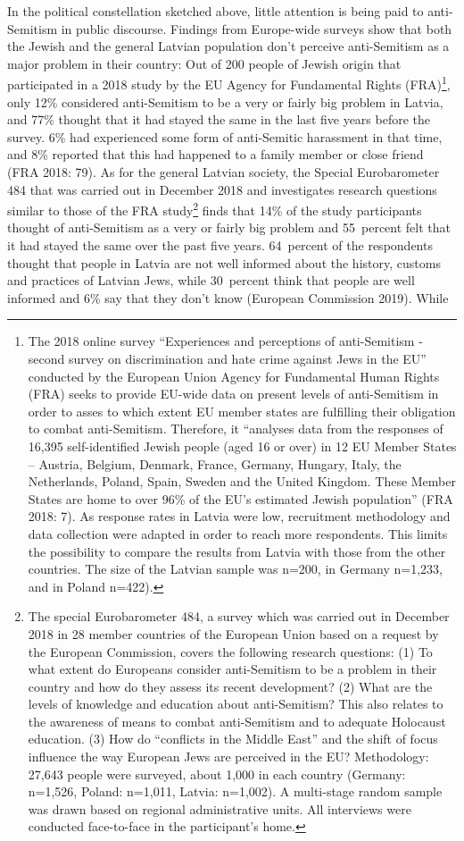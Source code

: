 In the political constellation sketched above, little attention is being paid to anti-Semitism in public discourse. Findings from Europe-wide surveys show that both the Jewish and the general Latvian population don't perceive anti-Semitism as a major problem in their country: Out of 200 people of Jewish origin that participated in a 2018 study by the EU Agency for Fundamental Rights (FRA)\footnote{The 2018 online survey ``Experiences and perceptions of anti-Semitism - second survey on discrimination and hate crime against Jews in the EU'' conducted by the European Union Agency for Fundamental Human Rights (FRA) seeks to provide EU-wide data on present levels of anti-Semitism in order to asses to which extent EU member states are fulfilling their obligation to combat anti-Semitism. Therefore, it ``analyses data from the responses of 16,395 self-identified Jewish people (aged 16 or over) in 12 EU Member States – Austria, Belgium, Denmark, France, Germany, Hungary, Italy, the Netherlands, Poland, Spain, Sweden and the United Kingdom. These Member States are home to over 96\% of the EU’s estimated Jewish population'' (FRA 2018: 7). As response rates in Latvia were low, recruitment methodology and data collection were adapted in order to reach more respondents. This limits the possibility to compare the results from Latvia with those from the other countries. The size of the Latvian sample was n=200, in Germany n=1,233, and in Poland n=422).}, only 12\% considered anti-Semitism to be a very or fairly big problem in Latvia, and 77\% thought that it had stayed the same in the last five years before the survey. 6\% had experienced some form of anti-Semitic harassment in that time, and 8\% reported that this had happened to a family member or close friend (FRA 2018: 79). As for the general Latvian society, the Special Eurobarometer 484 that was carried out in December 2018 and investigates research questions similar to those of the FRA study\footnote{The special Eurobarometer 484, a survey which was carried out in December 2018 in 28 member countries of the European Union based on a request by the European Commission, covers the following research questions: (1) To what extent do Europeans consider anti-Semitism to be a problem in their country and how do they assess its recent development? (2) What are the levels of knowledge and education about anti-Semitism? This also relates to the awareness of means to combat anti-Semitism and to adequate Holocaust education. (3) How do ``conflicts in the Middle East'' and the shift of focus influence the way European Jews are perceived in the EU? Methodology: 27,643 people were surveyed, about 1,000 in each country (Germany: n=1,526, Poland: n=1,011, Latvia: n=1,002). A multi-stage random sample was drawn based on regional administrative units. All interviews were conducted face-to-face in the participant’s home.} finds that 14\% of the study participants thought of anti-Semitism as a very or fairly big problem and 55\ percent felt that it had stayed the same over the past five years. 64\ percent of the respondents thought that people in Latvia are not well informed about the history, customs and practices of Latvian Jews, while 30\ percent think that people are well informed and 6\% say that they don't know (European Commission 2019). While 